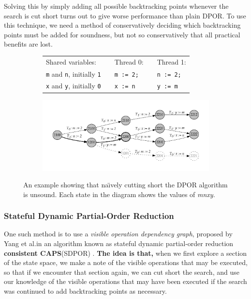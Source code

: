 \documentclass[12pt,a4paper,twoside,openright]{report}
\begin{document}
Solving this by simply adding
all possible backtracking points
whenever the search is cut short turns out to
give worse performance than plain DPOR.
To use this technique,
we need a method of conservatively deciding which
backtracking points must be added for soundness, but not
so conservatively that all practical benefits are lost.

\begin{figure}
	\begin{subfigure}{\textwidth}
		\begin{tabular}{lp{1cm}lp{0cm}l}
		Shared variables: &&Thread 0: &&Thread 1: \\
		\qquad \texttt{m} and \texttt{n}, initially \texttt{1}
			&&\qquad\texttt{m := 2;}
			&& \qquad\texttt{n := 2;} \\
		\qquad \texttt{x} and \texttt{y}, initially \texttt{0}
			&&\qquad\texttt{x := n}
			&& \qquad\texttt{y := m}
		\end{tabular}
	\end{subfigure}
	\begin{subfigure}{\textwidth}
		\includegraphics[width=\textwidth]{sdpor}
	\end{subfigure}
	\caption[An example illustrating the need for the
		Stateful DPOR algorithm.]
		{An example showing that na\"{\i}vely
		cutting short the DPOR algorithm is
		unsound. Each state in the diagram shows
	the values of \textit{mnxy}.}
	\label{fig:sdpor-motivation}
\end{figure}

\subsubsection{Stateful Dynamic Partial-Order Reduction}

One such method is to use a \emph{visible operation dependency
graph}, proposed by Yang et al.\@ in an
algorithm known as stateful dynamic
partial-order reduction \textbf{consistent CAPS}(SDPOR) \cite{yang08}.
\textbf{The idea is that, }when we first explore
a section of the state space,
we make a note of the visible operations
that may be executed, so that if we encounter that section again,
we can cut short the search, and use our knowledge of the
visible operations that may have been
executed if the search was continued
to add backtracking points as necessary.
\end{document}
